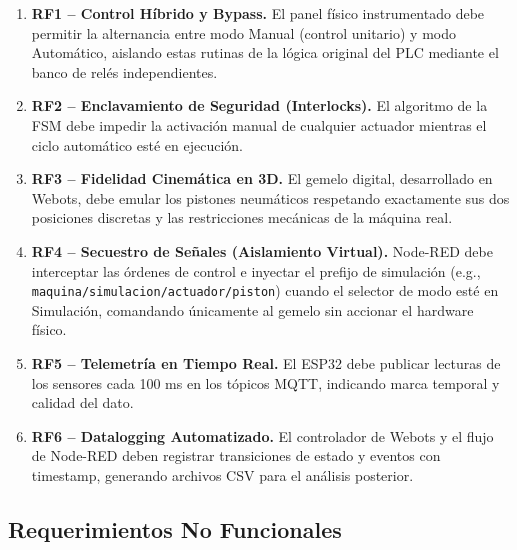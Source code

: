 \begin{enumerate}
    \item \textbf{RF1 – Control Híbrido y Bypass.} El panel físico instrumentado debe permitir la alternancia entre modo Manual (control unitario) y modo Automático, aislando estas rutinas de la lógica original del PLC mediante el banco de relés independientes.
    \item \textbf{RF2 – Enclavamiento de Seguridad (Interlocks).} El algoritmo de la FSM debe impedir la activación manual de cualquier actuador mientras el ciclo automático esté en ejecución.
    \item \textbf{RF3 – Fidelidad Cinemática en 3D.} El gemelo digital, desarrollado en Webots, debe emular los pistones neumáticos respetando exactamente sus dos posiciones discretas y las restricciones mecánicas de la máquina real.
    \item \textbf{RF4 – Secuestro de Señales (Aislamiento Virtual).} Node-RED debe interceptar las órdenes de control e inyectar el prefijo de simulación (e.g., \texttt{maquina/simulacion/actuador/piston}) cuando el selector de modo esté en Simulación, comandando únicamente al gemelo sin accionar el hardware físico.
    \item \textbf{RF5 – Telemetría en Tiempo Real.} El ESP32 debe publicar lecturas de los sensores cada 100 ms en los tópicos MQTT, indicando marca temporal y calidad del dato.
    \item \textbf{RF6 – Datalogging Automatizado.} El controlador de Webots y el flujo de Node-RED deben registrar transiciones de estado y eventos con timestamp, generando archivos CSV para el análisis posterior.
\end{enumerate}

\subsection{Requerimientos No Funcionales}

